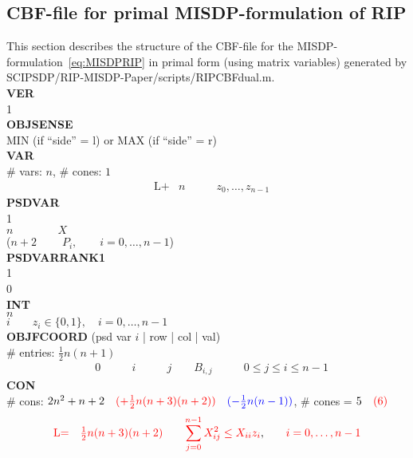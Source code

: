 \documentclass[11pt,a4paper]{article}
\theoremstyle{definition}
\begin{document}
\subsection{CBF-file for primal MISDP-formulation of RIP}
\label{sec:CBFprimal}
This section describes the structure of the CBF-file for the
MISDP-formulation~\eqref{eq:MISDPRIP} in primal form (using matrix variables)
generated by
\textsf{SCIPSDP/RIP-MISDP-Paper/scripts/RIPCBFdual.m}.\\

{\footnotesize
\noindent
\textbf{VER} \\
1 \\
\textbf{OBJSENSE} \\
MIN (if ``side'' = l) \; or \; MAX (if ``side'' = r) \\
\textbf{VAR} \\
\# vars:  $n$, \qquad \# cones: $1$ \\
\[
  \begin{aligned}
    &\text{L+} &n \qquad & z_0,\dots,z_{n-1}
  \end{aligned}
\]
\textbf{PSDVAR} \\
1  \\
$n \qquad \qquad X$ \\
{\color{red} ($n+2 \qquad \; P_i, \qquad i = 0,\dots,n-1$)}\\
{\color{green}\textbf{PSDVARRANK1}  \\
1 \\
0\\}
\textbf{INT} \\
$n$ \\
$i \qquad z_i \in \{0,1\}, \quad i = 0,\dots,n-1$ \\
\textbf{OBJFCOORD} (psd var $i$ | row | col | val) \\
\# entries: $\tfrac{1}{2}n(n+1)$\\
\[
  \begin{aligned}
    &0 \qquad &i \qquad &j \qquad B_{i,j} \qquad & 0\leq j \leq i \leq n-1
  \end{aligned}
\]
\textbf{CON} \\
\# cons: $2n^2+n+2 \quad {\color{red}(+\tfrac{1}{2}n(n+3)(n+2))} \quad
{\color{blue} (-\tfrac{1}{2}n(n-1))}$, \qquad
\# cones = $5 \quad {\color{red} (6)}$\\
\[
  \begin{aligned}
    &{\color{red}\text{L=}} & {\color{red}\tfrac{1}{2}n(n+3)(n+2)} \qquad 
    &{\color{red} \sum_{j=0}^{n-1} X_{ij}^2 \leq X_{ii}z_i}, \quad &
    {\color{red} i = 0,\dots, n-1} \\

\end{aligned}\]}
\end{document}
